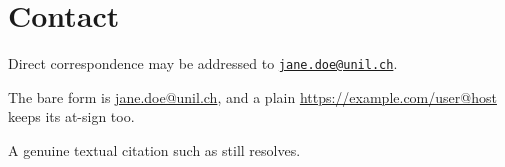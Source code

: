 \section{Contact}

Direct correspondence may be addressed to
\href{mailto:jane.doe@unil.ch}{\nolinkurl{jane.doe@unil.ch}}.

The bare form is \href{mailto:jane.doe@unil.ch}{jane.doe@unil.ch}, and a
plain \url{https://example.com/user@host} keeps its at-sign too.

A genuine textual citation such as \citet{smith2020} still resolves.
